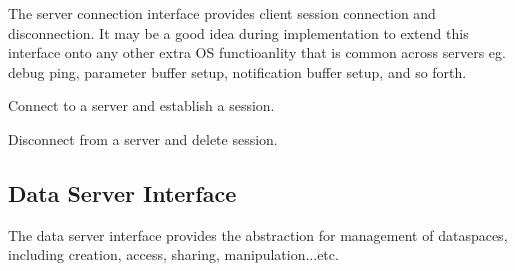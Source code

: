 The server connection interface provides client session connection and disconnection. It may be a
good idea during implementation to extend this interface onto any other extra OS functioanlity that
is common across servers eg. debug ping, parameter buffer setup, notification buffer setup, and so
forth.

\begin{description}

    \item {}
        Connect to a server and establish a session.

    \item {}
        Disconnect from a server and delete session.

\end{description}

\subsection{Data Server Interface}

The data server interface provides the abstraction for management of dataspaces, including
creation, access, sharing, manipulation...etc.


